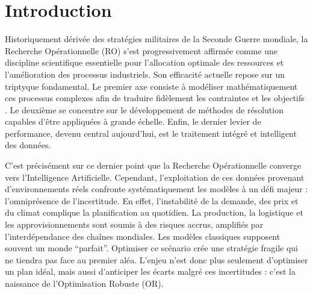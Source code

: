 \documentclass[12pt, a4paper, twoside]{article}
\numberwithin{equation}{section}
\begin{document}
	\vspace*{\fill}
	
	\clearpage
	\restoregeometry
	
	\clearpage
	\tableofcontents
	\thispagestyle{empty}
	
	\clearpage
	\listoffigures
	
	\clearpage
	\listoftables

    \clearpage
    \newpage
    \listofalgorithms
	
	\clearpage
	
	
	\section{Introduction}
	
	Historiquement dérivée des stratégies militaires de la Seconde Guerre mondiale, la Recherche Opérationnelle (RO) s'est progressivement affirmée comme une discipline scientifique essentielle pour l'allocation optimale des ressources et l'amélioration des processus industriels. Son efficacité actuelle repose sur un triptyque fondamental. Le premier axe consiste à modéliser mathématiquement ces processus complexes afin de traduire fidèlement les contraintes et les objectifs . Le deuxième se concentre sur le développement de méthodes de résolution capables d'être appliquées à grande échelle. Enfin, le dernier levier de performance, devenu central aujourd'hui, est le traitement intégré et intelligent des données.

    C'est précisément sur ce dernier point que la Recherche Opérationnelle converge vers l'Intelligence Artificielle. Cependant, l'exploitation de ces données provenant d'environnements réels confronte systématiquement les modèles à un défi majeur : l'omniprésence de l'incertitude. En effet, l'instabilité de la demande, des prix et du climat complique la planification au quotidien. La production, la logistique et les approvisionnements sont soumis à des risques accrus, amplifiés par l'interdépendance des chaînes mondiales. Les modèles classiques supposent souvent un monde \enquote{parfait}. Optimiser ce scénario crée une stratégie fragile qui ne tiendra pas face au premier aléa. L'enjeu n'est donc plus seulement d'optimiser un plan idéal, mais aussi d’anticiper les écarts malgré ces incertitudes : c'est la naissance de l'Optimisation Robuste (OR).
\end{document}
